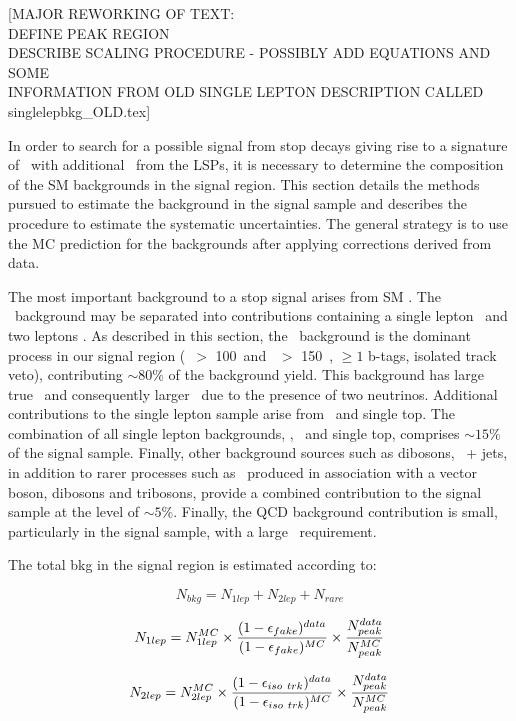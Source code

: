
[MAJOR REWORKING OF TEXT: \\
DEFINE PEAK REGION \\
DESCRIBE SCALING PROCEDURE - POSSIBLY ADD EQUATIONS AND SOME \\
INFORMATION FROM OLD SINGLE LEPTON DESCRIPTION CALLED
singlelepbkg\_OLD.tex] 

In order to search for a possible signal from stop decays giving rise to a signature of \ttbar\ with additional \met\
from the LSPs, it is necessary to determine the composition of the SM backgrounds in the signal region. 
This section details the methods pursued to estimate the background in the signal sample and describes the 
procedure to estimate the systematic uncertainties. The general strategy is to use the MC prediction for the 
backgrounds after applying corrections derived from data. 

The most important background to a stop signal arises from SM \ttbar. The \ttbar\ background may be 
separated into contributions containing a single lepton \ttlj\ and two leptons \ttll. As described in this section, 
the \ttll\ background is the dominant process in our signal region (\met\ $>$ 100~\GeV and \mt\ $>$ 150~\GeV, $\ge 1$ b-tags, isolated track veto),
contributing $\sim 80\%$ of the background yield.
%
This background has large true \met\ and consequently larger \mt\ due to the presence of two neutrinos.
Additional contributions to the single lepton sample arise from \wjets\ and single top. The combination of 
all single lepton backgrounds, \ttlj, \wjets\ and single top, comprises $\sim 15\%$ of the signal sample. 
Finally, other background sources such as dibosons, \dy\ + jets, in addition to rarer processes such as \ttbar\ 
produced in association with a vector boson, dibosons and tribosons,
provide a combined contribution to the signal 
sample at the level of $\sim 5\%$.
Finally, the QCD background contribution is small, particularly in the signal sample, with a large \met\ requirement.

The total bkg in the signal region is estimated according to:

$$ N_{bkg}  = N_{1 lep} + N_{2 lep} + N_{rare} $$

$$ N_{1 lep} = N_{1 lep}^{MC} 
\times 
{(1- \epsilon_{fake})^{data} \over (1 - \epsilon_{fake})^{MC}} 
\times 
{N_{peak}^{data} \over N_{peak}^{MC}}
$$

$$ N_{2 lep} = N_{2 lep}^{MC} 
\times 
{(1- \epsilon_{iso\ trk})^{data} \over (1 - \epsilon_{iso\ trk})^{MC}} 
\times 
{N_{peak}^{data} \over N_{peak}^{MC}}
$$


